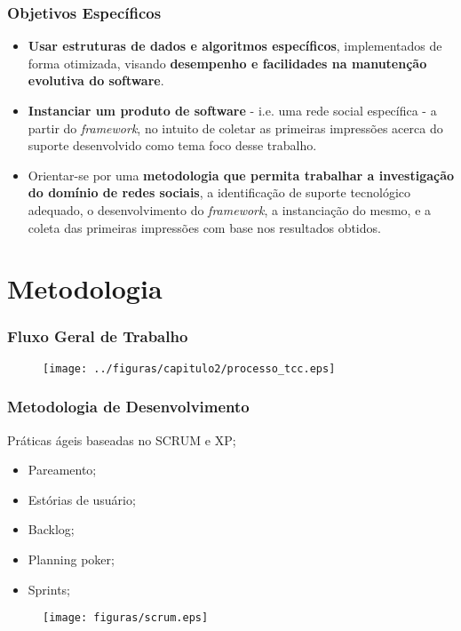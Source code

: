 \documentclass{beamer}
\begin{document}
\begin{frame}
\frametitle{Objetivos Específicos}

\begin{itemize}
	\item \textbf{Usar estruturas de dados e algoritmos específicos}, implementados de forma otimizada, visando \textbf{desempenho e facilidades na manutenção evolutiva do software}.
	\item \textbf{Instanciar um produto de software} - i.e. uma rede social específica - a partir do \textit{framework}, no intuito de coletar as primeiras impressões acerca do suporte desenvolvido como tema foco desse trabalho.
	\item Orientar-se por uma \textbf{metodologia que permita trabalhar a investigação do domínio de redes sociais}, a identificação de suporte tecnológico adequado, o desenvolvimento do \textit{framework}, a instanciação do mesmo, e a coleta das primeiras impressões com base nos resultados obtidos.
\end{itemize}

\end{frame}

\section{Metodologia}

\begin{frame}
\frametitle{Fluxo Geral de Trabalho}

\begin{figure}[h]
	\centering
	\texttt{[image: ../figuras/capitulo2/processo\_tcc.eps]}
\end{figure}

\end{frame}

\begin{frame}
\frametitle{Metodologia de Desenvolvimento}

Práticas ágeis baseadas no SCRUM e XP;

\begin{itemize}
	\item Pareamento;
	\item Estórias de usuário;
	\item Backlog;
	\item Planning poker;
	\item Sprints;
\end{itemize}

\begin{figure}[h]
	\centering
	\texttt{[image: figuras/scrum.eps]}
\end{figure}

\end{frame}
\end{document}
